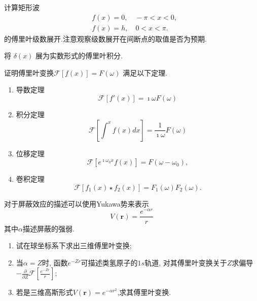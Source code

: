 \documentclass[10pt]{article}
\newenvironment{problem}[2][]{\begin{trivlist}
\item[\hskip \labelsep {\bfseries #1}\hskip \labelsep {\bfseries #2}]}{\end{trivlist}}
\begin{document}
\renewcommand{\labelenumi}{(\arabic{enumi})}
\renewcommand{\labelenumii}{(\arabic{enumi}.\arabic{enumii})}



 




\begin{problem}{6.1}
  
计算矩形波$$
\begin{aligned}
& f(x)=0, \quad-\pi<x<0, \\
& f(x)=h, \quad 0<x<\pi .
\end{aligned}
$$
的傅里叶级数展开.注意观察级数展开在间断点的取值是否为预期.
\end{problem}

\begin{problem}{6.2}
  将 $\delta(x)$ 展为实数形式的傅里叶积分.
\end{problem}
  
\begin{problem}{6.3}
证明傅里叶变换$\mathcal{F}[f(x)] = F(\omega)$ 满足以下定理.
\begin{enumerate}
  \item 导数定理
  $$
      \mathcal{F} [f'(x)] = \imath \omega F(\omega)
  $$

  \item 积分定理
  $$
      \mathcal{F} [ \int^{x} f(x) dx ] = \frac{1}{\imath \omega} F(\omega)
  $$
  \item 位移定理
  $$
      \mathcal{F} [ e^{\imath \omega_0 x} f(x) ] = F(\omega - \omega_0),
  $$
  \item 卷积定理
  $$
      \mathcal{F} [f_1(x)\star f_2(x) ] = F_1(\omega) F_2(\omega).
  $$
\end{enumerate}
\end{problem}
   
\begin{problem}{6.4}
对于屏蔽效应的描述可以使用Yukawa势来表示
$$
V(\mathbf{r}) = \frac{e^{-\alpha r}}{r}
$$
其中$\alpha$描述屏蔽的强弱.
\begin{enumerate}
  \item 试在球坐标系下求出三维傅里叶变换;
  \item 当$\alpha=Z$时, 函数$e^{-Zr}$可描述类氢原子的$1s$轨道, 对其傅里叶变换关于$Z$求偏导
  $-\frac{\partial}{\partial Z} \mathcal{F} \left[ \frac{e^{-Z r}}{r}\right]$;
  \item 若是三维高斯形式$V(\mathbf{r}) = e^{-\alpha r^2}$,求其傅里叶变换.
\end{enumerate}
\end{problem}
\end{document}
